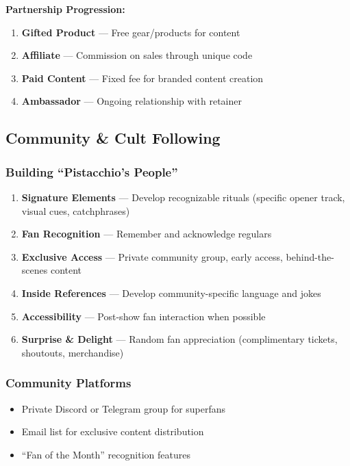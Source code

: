 \documentclass[11pt,a4paper]{article}
\begin{document}
\noindent\textbf{Partnership Progression:}
\begin{enumerate}[leftmargin=*]
    \item \textbf{Gifted Product} --- Free gear/products for content
    \item \textbf{Affiliate} --- Commission on sales through unique code
    \item \textbf{Paid Content} --- Fixed fee for branded content creation
    \item \textbf{Ambassador} --- Ongoing relationship with retainer
\end{enumerate}

\subsection{Community \& Cult Following}

\subsubsection{Building ``Pistacchio's People''}

\begin{enumerate}[leftmargin=*]
    \item \textbf{Signature Elements} --- Develop recognizable rituals (specific opener track, visual cues, catchphrases)
    \item \textbf{Fan Recognition} --- Remember and acknowledge regulars
    \item \textbf{Exclusive Access} --- Private community group, early access, behind-the-scenes content
    \item \textbf{Inside References} --- Develop community-specific language and jokes
    \item \textbf{Accessibility} --- Post-show fan interaction when possible
    \item \textbf{Surprise \& Delight} --- Random fan appreciation (complimentary tickets, shoutouts, merchandise)
\end{enumerate}

\subsubsection{Community Platforms}
\begin{itemize}[leftmargin=*]
    \item Private Discord or Telegram group for superfans
    \item Email list for exclusive content distribution
    \item ``Fan of the Month'' recognition features
\end{itemize}
\end{document}
